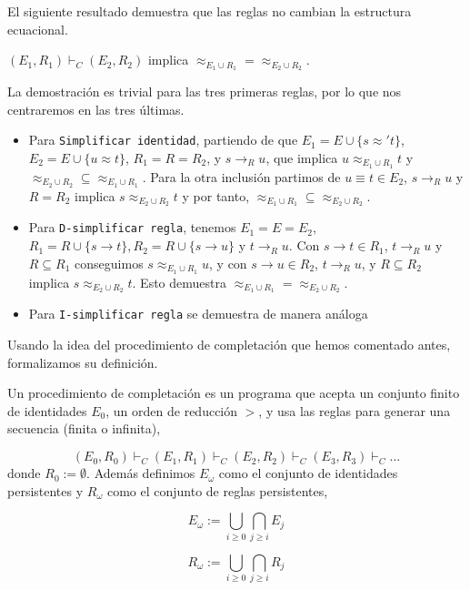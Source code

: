 El siguiente resultado demuestra que las reglas no cambian la
estructura ecuacional.

\begin{lema}
  $(E_1,R_1) \vdash_C (E_2,R_2)$ implica
  $\approx_{E_1 \cup R_1} = \approx_{E_2 \cup R_2}$.
\end{lema}

\begin{demo}
  La demostración es trivial para las tres primeras reglas, por lo que
  nos centraremos en las tres últimas.
  \begin{itemize}
  \item Para \texttt{Simplificar identidad}, partiendo de que
    $E_1 = E \cup \{s \approx' t\}$, $E_2 = E \cup \{ u \approx t \}$,
    $R_1 = R = R_2$, y $s \rightarrow_R u$, que implica
    $u \approx_{E_1 \cup R_1} t$ y
    $\approx_{E_2 \cup R_2} \subseteq \approx_{E_1 \cup R_1}$. Para la
    otra inclusión partimos de $u \equiv t \in E_2$,
    $s \rightarrow_R u$ y $R = R_2$ implica
    $s \approx_{E_2 \cup R_2} t$ y por tanto,
    $\approx_{E_1 \cup R_1} \subseteq \approx_{E_2 \cup R_2}$.
  \item Para \texttt{D-simplificar regla}, tenemos $E_1 = E = E_2$,
    $R_1 = R \cup \{s \rightarrow t \}, R_2 = R \cup \{s \rightarrow
    u\}$ y $t \rightarrow_R u$. Con $s \rightarrow t \in R_1$,
    $t \rightarrow_R u$ y $R \subseteq R_1$ conseguimos
    $s \approx_{E_1 \cup R_1} u$, y con $s \rightarrow u \in R_2$,
    $t \rightarrow_R u$, y $R \subseteq R_2$ implica
    $s \approx_{E_2 \cup R_2} t$. Esto demuestra
    $\approx_{E_1 \cup R_1} = \approx_{E_2 \cup R_2}$.
  \item Para \texttt{I-simplificar regla} se demuestra de manera análoga
\end{itemize}
\end{demo}

Usando la idea del procedimiento de completación que hemos comentado
antes, formalizamos su definición.

\begin{defi}
  Un procedimiento de completación es un programa que acepta un
  conjunto finito de identidades $E_0$, un orden de reducción $>$, y
  usa las reglas para generar una secuencia (finita o infinita),

  \[
    (E_0,R_0) \vdash_C (E_1,R_1) \vdash_C (E_2,R_2) \vdash_C (E_3,
    R_3) \vdash_C \dots
  \]
  donde $R_0 := \emptyset$.  Además definimos $E_\omega$ como el
  conjunto de identidades persistentes y $R_\omega$ como el conjunto
  de reglas persistentes,

  \[
    E_\omega := \bigcup_{i \geq 0} \bigcap_{j \geq i} E_j
  \]

  \[
R_\omega :=  \bigcup_{i \geq 0} \bigcap_{j \geq i} R_j
  \]
  
\end{defi}

